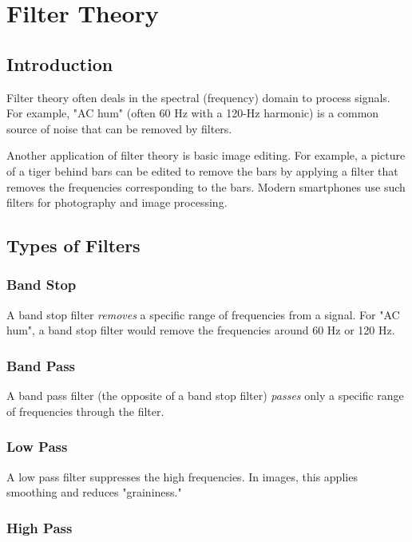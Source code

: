 \section{Filter Theory}

\subsection{Introduction}

Filter theory often deals in the spectral (frequency) domain to process signals. For example, "AC hum" (often 60 Hz with a 120-Hz harmonic) is a common source of noise that can be removed by filters.

\vsp

Another application of filter theory is basic image editing. For example, a picture of a tiger behind bars can be edited to remove the bars by applying a filter that removes the frequencies corresponding to the bars. Modern smartphones use such filters for photography and image processing.

\subsection{Types of Filters}

\subsubsection{Band Stop}

A band stop filter \emph{removes} a specific range of frequencies from a signal. For "AC hum", a band stop filter would remove the frequencies around 60 Hz or 120 Hz.

\subsubsection{Band Pass}

A band pass filter (the opposite of a band stop filter) \emph{passes} only a specific range of frequencies through the filter.

\subsubsection{Low Pass}

A low pass filter suppresses the high frequencies. In images, this applies smoothing and reduces "graininess."

\subsubsection{High Pass}

